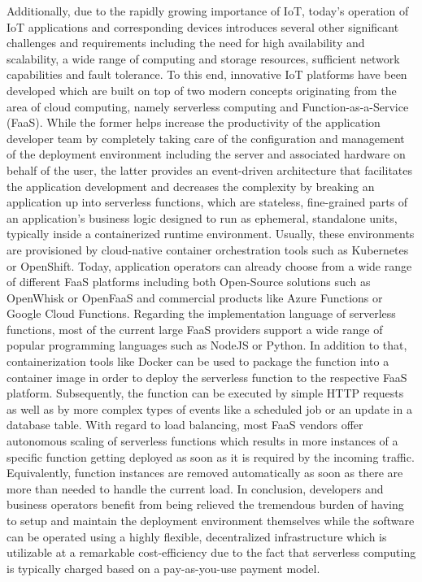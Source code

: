 Additionally, due to the rapidly growing importance of IoT, today's operation of IoT applications and corresponding devices introduces several other significant challenges and requirements including the need for high availability and scalability, a wide range of computing and storage resources, sufficient network capabilities and fault tolerance. To this end, innovative IoT platforms have been developed which are built on top of two modern concepts originating from the area of cloud computing, namely serverless computing and Function-as-a-Service (FaaS). While the former helps increase the productivity of the application developer team by completely taking care of the configuration and management of the deployment environment including the server and associated hardware on behalf of the user, the latter provides an event-driven architecture that facilitates the application development and decreases the complexity by breaking an application up into serverless functions, which are stateless, fine-grained parts of an application's business logic designed to run as ephemeral, standalone units, typically inside a containerized runtime environment. Usually, these environments are provisioned by cloud-native container orchestration tools such as Kubernetes or OpenShift. Today, application operators can already choose from a wide range of different FaaS platforms including both Open-Source solutions such as OpenWhisk or OpenFaaS and commercial products like Azure Functions or Google Cloud Functions. Regarding the implementation language of serverless functions, most of the current large FaaS providers support a wide range of popular programming languages such as NodeJS or Python. In addition to that, containerization tools like Docker can be used to package the function into a container image in order to deploy the serverless function to the respective FaaS platform. Subsequently, the function can be executed by simple HTTP requests as well as by more complex types of events like a scheduled job or an update in a database table. With regard to load balancing, most FaaS vendors offer autonomous scaling of serverless functions which results in more instances of a specific function getting deployed as soon as it is required by the incoming traffic. Equivalently, function instances are removed automatically as soon as there are more than needed to handle the current load.  In conclusion, developers and business operators benefit from being relieved the tremendous burden of having to setup and maintain the deployment environment themselves while the software can be operated using a highly flexible, decentralized infrastructure which is utilizable at a remarkable cost-efficiency due to the fact that serverless computing is typically charged based on a pay-as-you-use payment model. 

